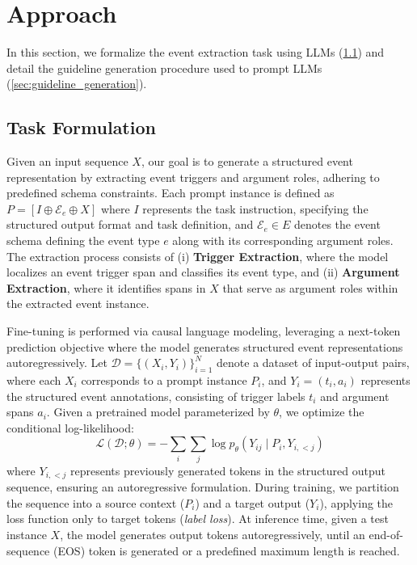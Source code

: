 \section{Approach}
In this section, we formalize the event extraction task using LLMs (\textsection \ref{sec:formulation}) and detail the guideline generation procedure used to prompt LLMs (\textsection \ref{sec:guideline_generation}).

\subsection{Task Formulation}
\label{sec:formulation}
Given an input sequence \( X \), our goal is to generate a structured event representation by extracting {event triggers} and {argument roles}, adhering to predefined schema constraints. Each prompt instance is defined as  $P = [I \oplus \mathcal{E}_e \oplus X]$ where \( I \) represents the {task instruction}, specifying the structured output format and task definition, and \( \mathcal{E}_e \in E\) denotes the {event schema} defining the event type \( e \) along with its corresponding argument roles. The extraction process consists of (i) \textbf{Trigger Extraction}, where the model localizes an event trigger span and classifies its event type, and (ii) \textbf{Argument Extraction}, where it identifies spans in \( X \) that serve as argument roles within the extracted event instance.  

Fine-tuning is performed via {causal language modeling}, leveraging a {next-token prediction objective} where the model generates structured event representations autoregressively. Let \( \mathcal{D} = \{(X_i, Y_i)\}_{i=1}^{N} \) denote a dataset of input-output pairs, where each \( X_i \) corresponds to a prompt instance \( P_i \), and \( Y_i = (t_i, a_i) \) represents the structured event annotations, consisting of trigger labels \( t_i \) and argument spans \( a_i \). Given a {pretrained model} parameterized by \( \theta \), we optimize the {conditional log-likelihood}:
\begin{equation}
    \mathcal{L}(\mathcal{D}; \theta) = - \sum_{i} \sum_{j} \log p_{\theta} (Y_{ij} \mid P_i, Y_{i,<j})
\end{equation}
where \( Y_{i,<j} \) represents previously generated tokens in the structured output sequence, ensuring an autoregressive formulation. During training, we partition the sequence into a {source context} (\( P_i \)) and a {target output} (\( Y_i \)), applying the loss function {only to target tokens} (\emph{label loss}). At inference time, given a test instance $X$,  the model generates output tokens autoregressively, until an end-of-sequence (EOS) token is generated or a predefined maximum length is reached.



